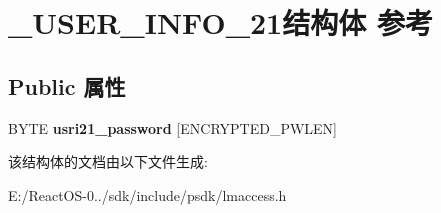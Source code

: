 \hypertarget{struct___u_s_e_r___i_n_f_o__21}{}\section{\+\_\+\+U\+S\+E\+R\+\_\+\+I\+N\+F\+O\+\_\+21结构体 参考}
\label{struct___u_s_e_r___i_n_f_o__21}
\subsection*{Public 属性}
\begin{DoxyCompactItemize}
\item 
\mbox{\label{struct___u_s_e_r___i_n_f_o__21_a23d00eff0457478a28a85fcf4660ae51}} 
B\+Y\+TE {\bfseries usri21\+\_\+password} \mbox{[}E\+N\+C\+R\+Y\+P\+T\+E\+D\+\_\+\+P\+W\+L\+EN\mbox{]}
\end{DoxyCompactItemize}


该结构体的文档由以下文件生成\+:\begin{DoxyCompactItemize}
\item 
E\+:/\+React\+O\+S-\/0../sdk/include/psdk/lmaccess.\+h\end{DoxyCompactItemize}
